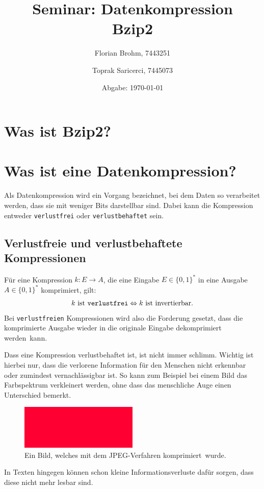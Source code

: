 \documentclass{article}
\date{Abgabe: \today}
\author{Florian Brohm, 7443251 \and Toprak Saricerci, 7445073}
\title{Seminar: Datenkompression\\Bzip2}
\newcommand{\Llr}{\Leftrightarrow}
\newcommand{\para}{\par\null\par}
\begin{document}
\maketitle
\newpage

{
    \hypersetup{linkcolor=blue}
    \tableofcontents
}
\listoftables
\listoffigures
\newpage
\section{Was ist Bzip2?}
\vspace*{3cm}
\section{Was ist eine Datenkompression?}
Als Datenkompression wird ein Vorgang bezeichnet, bei dem Daten so verarbeitet werden, 
dass sie mit weniger Bits darstellbar sind. Dabei kann die Kompression entweder 
\texttt{verlustfrei} oder \texttt{verlustbehaftet} sein.
\subsection{Verlustfreie und verlustbehaftete Kompressionen}
Für eine Kompression $k: E \to A$, die eine Eingabe $E \in \{0,1\}^*$ in eine Ausgabe $A \in \{0,1\}^*$
komprimiert, gilt:
\[k \text{ ist \texttt{verlustfrei}} \Llr k \text{ ist invertierbar}.\]
Bei \texttt{verlustfreien} Kompressionen wird also die Forderung gesetzt, dass die 
komprimierte Ausgabe wieder in die originale Eingabe dekomprimiert werden~kann.
\para
Dass eine Kompression verlustbehaftet ist, ist nicht immer schlimm. Wichtig ist hierbei nur, 
dass die verlorene Information für den Menschen nicht erkennbar oder zumindest 
vernachlässigbar ist. So kann zum Beispiel bei einem Bild das Farbspektrum 
verkleinert werden, ohne dass das menschliche Auge einen Unterschied bemerkt.
\begin{figure}[H]
    \centering
    \includegraphics*[width=0.5\textwidth]{images/verlustbehaftet-bild.png}
    \caption[Verlustbehaftete Kompression eines Bildes]{
        Ein Bild, welches mit dem JPEG-Verfahren komprimiert~wurde.
    }
\end{figure}
In Texten hingegen können schon kleine Informationsverluste dafür sorgen, 
dass diese nicht mehr lesbar sind.
\newpage
\end{document}
